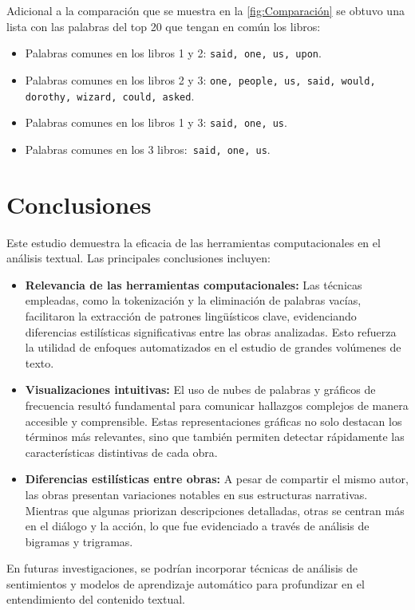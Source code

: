 \documentclass[conference]{IEEEtran}
\begin{document}
	\FloatBarrier

Adicional a la comparación que se muestra en la \ref{fig:Comparación} se obtuvo una lista con las palabras del top 20 que tengan en común los libros:

\begin{itemize}

\item Palabras comunes en los libros 1 y 2: \texttt{said, one, us, upon}.

\item Palabras comunes en los libros 2 y 3: \texttt{one, people, us, said, would, dorothy, wizard, could, asked}.

\item Palabras comunes en los libros 1 y 3: \texttt{said, one, us}.

\item Palabras comunes en los 3 libros:\texttt{ said, one, us}.

\end{itemize}



\section{Conclusiones}

Este estudio demuestra la eficacia de las herramientas computacionales en el análisis textual. Las principales conclusiones incluyen:

\begin{itemize}

    \item \textbf{Relevancia de las herramientas computacionales: }Las técnicas empleadas, como la tokenización y la eliminación de palabras vacías, facilitaron la extracción de patrones lingüísticos clave, evidenciando diferencias estilísticas significativas entre las obras analizadas. Esto refuerza la utilidad de enfoques automatizados en el estudio de grandes volúmenes de texto.

    \item \textbf{Visualizaciones intuitivas:} El uso de nubes de palabras y gráficos de frecuencia resultó fundamental para comunicar hallazgos complejos de manera accesible y comprensible. Estas representaciones gráficas no solo destacan los términos más relevantes, sino que también permiten detectar rápidamente las características distintivas de cada obra.

    \item \textbf{Diferencias estilísticas entre obras:} A pesar de compartir el mismo autor, las obras presentan variaciones notables en sus estructuras narrativas. Mientras que algunas priorizan descripciones detalladas, otras se centran más en el diálogo y la acción, lo que fue evidenciado a través de análisis de bigramas y trigramas.
    
\end{itemize}

En futuras investigaciones, se podrían incorporar técnicas de análisis de sentimientos y modelos de aprendizaje automático para profundizar en el entendimiento del contenido textual.
\end{document}
